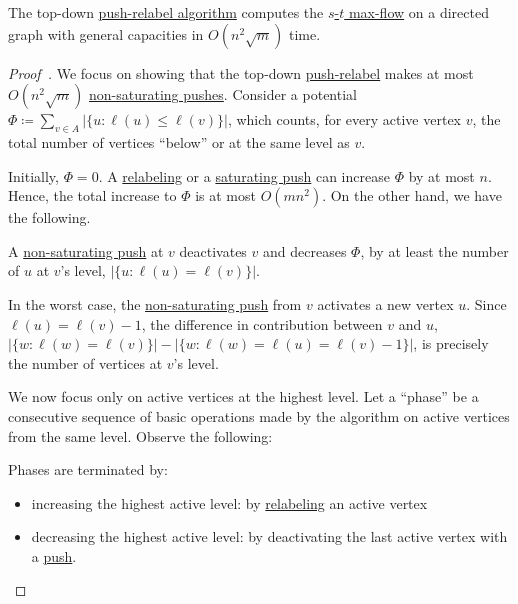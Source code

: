 \begin{theorem}
	The top-down \hyperref[algo:push-relabel]{push-relabel algorithm} computes the \hyperref[prb:s-t-max-flow]{\(s\)-\(t\) max-flow} on a directed graph with general capacities in \(O(n^2 \sqrt{m} )\) time.
\end{theorem}
\begin{proof}[Proof~\cite{cheriyan1999analysis}]
	We focus on showing that the top-down \hyperref[algo:push-relabel]{push-relabel} makes at most \(O(n^2 \sqrt{m} )\) \hyperref[algo:push-relabel-push-non-saturating]{non-saturating pushes}. Consider a potential \(\Phi \coloneqq \sum_{v \in A} \lvert \{ u \colon \ell (u) \leq \ell (v) \} \rvert\), which counts, for every active vertex \(v\), the total number of vertices ``below'' or at the same level as \(v\).

	Initially, \(\Phi = 0\). A \hyperref[algo:push-relabel-relabel]{relabeling} or a \hyperref[algo:push-relabel-push-saturating]{saturating push} can increase \(\Phi \) by at most \(n\). Hence, the total increase to \(\Phi \) is at most \(O(mn^2)\). On the other hand, we have the following.

	\begin{claim}
		A \hyperref[algo:push-relabel-push-non-saturating]{non-saturating push} at \(v\) deactivates \(v\) and decreases \(\Phi \), by at least the number of \(u\) at \(v\)'s level, \(\lvert \{ u \colon \ell (u) = \ell (v) \}  \rvert \).
	\end{claim}
	\begin{explanation}
		In the worst case, the \hyperref[algo:push-relabel-push-non-saturating]{non-saturating push} from \(v\) activates a new vertex \(u\). Since \(\ell (u) = \ell (v) - 1\), the difference in contribution between \(v\) and \(u\), \(\lvert \{ w \colon \ell (w) = \ell (v) \} \rvert - \lvert \{ w \colon \ell (w) = \ell (u) = \ell (v) - 1 \} \rvert \), is precisely the number of vertices at \(v\)'s level.
	\end{explanation}

	We now focus only on active vertices at the highest level. Let a ``phase'' be a consecutive sequence of basic operations made by the algorithm on active vertices from the same level. Observe the following:

	\begin{note}
		Phases are terminated by:
		\begin{itemize}
			\item increasing the highest active level: by \hyperref[algo:push-relabel-relabel]{relabeling} an active vertex
			\item decreasing the highest active level: by deactivating the last active vertex with a \hyperref[algo:push-relabel-push]{push}.
		\end{itemize}
	\end{note}


\end{proof}
